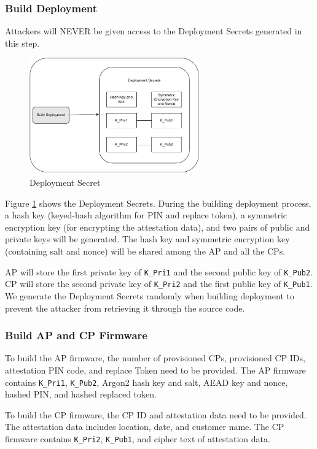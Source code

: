 \documentclass[11pt,oneside,onecolumn,letterpaper]{article}
\newcounter{alg}
\begin{document}
	\subsubsection{Build Deployment}
	Attackers will NEVER be given access to the Deployment Secrets generated in this step.
	\begin{figure}[h]
		\centering
		\includegraphics[width=0.65\textwidth]{pics/secret.pdf}
		\caption{Deployment Secret}
		\label{fig:secret}
	\end{figure}
	
	Figure \ref{fig:secret} shows the Deployment Secrets.
	During the building deployment process,
	a hash key (keyed-hash algorithm for PIN and replace token),
	a symmetric encryption key (for encrypting the attestation data),
	and two pairs of public and private keys will be generated.
	The hash key and symmetric encryption key (containing salt and nonce) will be shared among the AP and all the CPs.
	
	AP will store the first private key of \texttt{K\_Pri1} and the second public key of \texttt{K\_Pub2}.
	CP will store the second private key of \texttt{K\_Pri2} and the first public key of \texttt{K\_Pub1}.
	We generate the Deployment Secrets randomly when building deployment to prevent the attacker from retrieving it through the source code.
	
	\subsubsection{Build AP and CP Firmware}
	To build the AP firmware,
	the number of provisioned CPs,
	provisioned CP IDs,
	attestation PIN code,
	and replace Token need to be provided.
	The AP firmware contains \texttt{K\_Pri1},
	\texttt{K\_Pub2},
	Argon2 hash key and salt,
	AEAD key and nonce,
	hashed PIN,
	and hashed replaced token.
	
	
	To build the CP firmware,
	the CP ID and attestation data need to be provided.
	The attestation data includes location,
	date,
	and customer name.
	The CP firmware contains \texttt{K\_Pri2},
	\texttt{K\_Pub1},
	and cipher text of attestation data.
	
\end{document}
